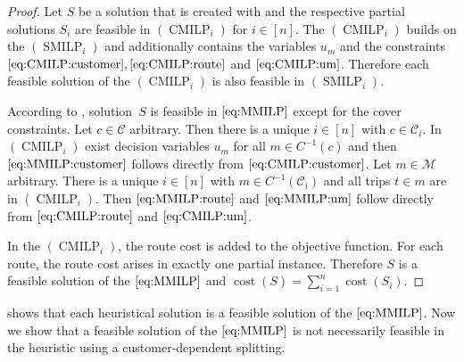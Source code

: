\begin{proof}

Let $S$ be a solution that is created with  and the respective partial solutions $S_i$ are feasible in $(\operatorname{CMILP}_i)$ for ${i\in[n]}$. The $(\operatorname{CMILP}_i)$ builds on the $(\operatorname{SMILP}_i)$ and additionally contains the variables $u_m$ and the constraints $\eqref{eq:CMILP:customer}, \eqref{eq:CMILP:route}$ and $\eqref{eq:CMILP:um}$. Therefore each feasible solution of the $(\operatorname{CMILP}_i)$ is also feasible in $(\operatorname{SMILP}_i)$.

According to , solution~$S$ is feasible in $\eqref{eq:MMILP}$ except for the cover constraints. Let $c\in\mathcal{C}$ arbitrary. Then there is a unique $i\in[n]$ with ${c\in\mathcal{C}_i}$. In $(\operatorname{CMILP}_i)$ exist decision variables $u_m$ for all ${m\in C^{-1}(c)}$ and then $\eqref{eq:MMILP:customer}$ follows directly from $\eqref{eq:CMILP:customer}$. Let ${m\in\mathcal{M}}$ arbitrary. There is a unique ${i\in[n]}$ with ${m\in C^{-1}(\mathcal{C}_i)}$ and all trips ${t\in m}$ are in $(\operatorname{CMILP}_i)$. Then $\eqref{eq:MMILP:route}$ and $\eqref{eq:MMILP:um}$ follow directly from $\eqref{eq:CMILP:route}$ and $\eqref{eq:CMILP:um}$. 

In the $(\operatorname{CMILP}_i)$, the route cost is added to the objective function. For each route, the route cost arises in exactly one partial instance. Therefore $S$ is a feasible solution of the $\eqref{eq:MMILP}$ and ${\operatorname{cost}(S) = \sum_{i=1}^n\operatorname{cost}\left(S_i\right)}$.

\end{proof}

 shows that each heuristical solution is a feasible solution of the $\eqref{eq:MMILP}$. Now we show that a feasible solution of the $\eqref{eq:MMILP}$ is not necessarily feasible in the heuristic using a customer-dependent splitting.

